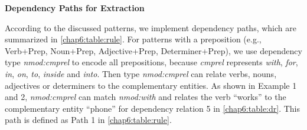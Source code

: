 \textbf{Dependency Paths for Extraction}

\begin{table}
\centering
{}
\caption{Summary of dependency paths}
\label{chap6:table:rule}
\end{table}

According to the discussed patterns, we implement dependency paths, which are summarized in \ref{chap6:table:rule}. For patterns with a preposition (e.g., Verb+Prep, Noun+Prep, Adjective+Prep, Determiner+Prep), we use dependency type \textit{nmod:cmprel} to encode all prepositions, because \textit{cmprel} represents \textit{with}, \textit{for}, \textit{in}, \textit{on}, \textit{to}, \textit{inside} and \textit{into}. Then type \textit{nmod:cmprel} can relate verbs, nouns, adjectives or determiners to the complementary entities. As shown in Example 1 and 2, \textit{nmod:cmprel} can match \textit{nmod:with} and relates the verb ``works'' to the complementary entity ``phone'' for dependency relation 5 in \ref{chap6:table:dr}. This path is defined as Path 1 in \ref{chap6:table:rule}.

